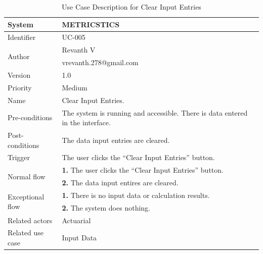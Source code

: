 \begin{table}[htb]
    \centering
    \begin{tabular}{|p{4cm}|p{12cm}|} \hline 
         System &  METRICSTICS\\ \hline 
         
         Identifier & UC-005 \\ \hline 
         
         \multirow{2}{*}{Author} & Revanth V  \\
         &vrevanth.278@gmail.com\\
           \hline 
           Version & 1.0\\ \hline
         
         Priority &  Medium\\ \hline 
         
         Name &  Clear Input Entries. \\ \hline 
         Pre-conditions & The system is running and accessible.
There is data entered in the interface. \\ \hline 
         Post-conditions & The data input entries are cleared. \\ \hline
         Trigger & The user clicks the “Clear Input Entries” button.
 \\ \hline
        \multirow{2}{*}{Normal flow} 
        & \textbf{1.}  The user clicks the “Clear Input Entries” button.\\ 
        & \textbf{2.} The data input entires are cleared.\\
         
         
        
        \hline
         \multirow{2}{*}{Exceptional flow} 
        & \textbf{1.}   There is no input data or calculation results. \\ 
        & \textbf{2.} The system does nothing. \\ \hline
         Related actors & Actuarial \\ \hline
        Related use case &  Input Data\\ \hline
    \end{tabular}
    \caption{Use Case Description for Clear Input Entries}
    \label{tab:my_label}
\end{table}
